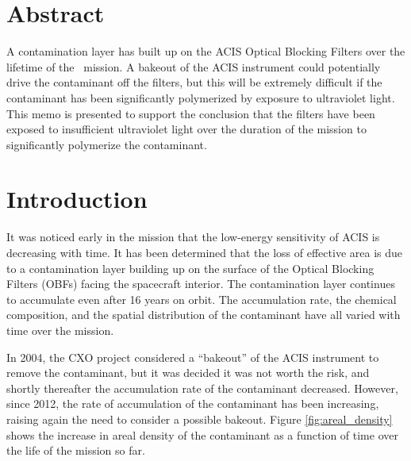 \documentclass[11pt]{article}
\begin{document}


\Date{\today}


\memo{}

\section{Abstract}

A contamination layer has built up on the ACIS Optical Blocking Filters over the
lifetime of the \chandra~mission. A bakeout of the ACIS instrument could potentially
drive the contaminant off the filters, but this will be extremely difficult if the
contaminant has been significantly polymerized by exposure to ultraviolet light.
This memo is presented to support the conclusion that the filters have been exposed
to insufficient ultraviolet light over the duration of the mission to significantly
polymerize the contaminant.

\section{Introduction}

It was noticed early in the mission that the low-energy sensitivity of ACIS is
decreasing with time. It has been determined that the loss of effective area is
due to a contamination layer building up on the surface of the Optical Blocking
Filters (OBFs) facing the spacecraft interior. The contamination layer continues
to accumulate even after 16 years on orbit. The accumulation rate, the chemical
composition, and the spatial distribution of the contaminant have all varied with
time over the mission.

In 2004, the CXO project considered a ``bakeout'' of the ACIS instrument to remove
the contaminant, but it was decided it was not worth the risk, and shortly thereafter
the accumulation rate of the contaminant decreased. However, since 2012, the rate of
accumulation of the contaminant has been increasing, raising again the need to consider
a possible bakeout. Figure \ref{fig:areal_density} shows the increase in areal density
of the contaminant as a function of time over the life of the mission so far.
\end{document}
